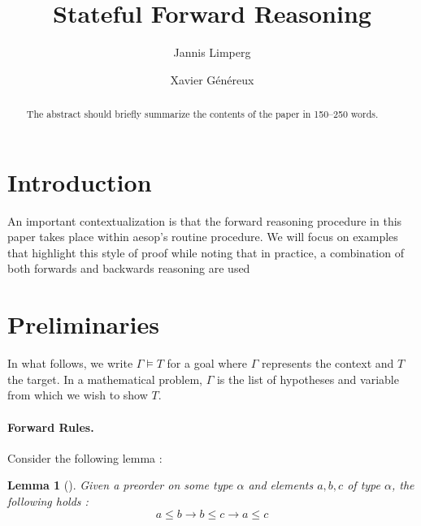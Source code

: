 \documentclass[runningheads]{llncs}
\newtheorem{lem}{Lemma}
\newcommand{\xcom}[1]{{\color{cyan}{Xavier: #1}} }
\begin{document}
%
\title{Stateful Forward Reasoning}
%
%
\author{Jannis Limperg \and
  Xavier Généreux}
%
%
%
\maketitle              %
%
\begin{abstract}
The abstract should briefly summarize the contents of the paper in
150--250 words.

\end{abstract}
%
%
%

\section{Introduction}
\xcom{TODO}

\xcom{ Specify the problem (user defined rules)
 + deal with changes with local context}
\xcom{ Talk about aesop}
\xcom{ Do we outline the solution?}

An important contextualization is that the forward reasoning procedure in this paper takes place
within aesop's routine procedure. We will focus on examples that highlight this style of proof
while noting that in practice, a combination of both forwards and backwards reasoning are used 
\section{Preliminaries}

\xcom{Adapt for CADE.}

In what follows, we write $\Gamma \models T$ for a goal where $\Gamma$ represents the context and
$T$ the target. In a mathematical problem, $\Gamma$ is the list of hypotheses and variable from
which we wish to show $T$.

\paragraph{Forward Rules.}
Consider the following lemma :
\begin{lem}[]
  Given a preorder on some type $\alpha$ and elements $a,b,c$ of type $\alpha$, the following holds :
  $$a \leq b \rightarrow b \leq c \rightarrow a \leq c$$
\end{lem}
\end{document}
